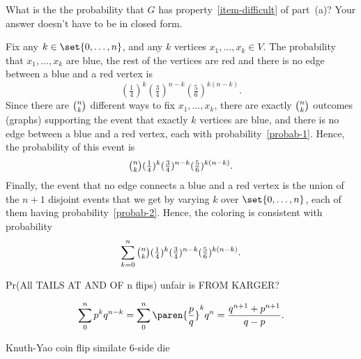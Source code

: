 \begin{problem}
\begin{enumerate}
\end{enumerate}


\ppart
What is the the probability that $G$ has
property~\eqref{item-difficult} of part~(a)? 
Your answer doesn't have  to be in closed form.

\begin{solution}
Fix any $k\in\set{0,\dots,n}$, and any $k$ vertices $x_1,\dots,x_k\in
V$. The probability that $x_1,\dots,x_k$ are blue, the rest of the
vertices are red and there is no edge between a blue and a red vertex
is 
\begin{equation} \label{probab-1}
(\tfrac{1}{4})^k 
(\tfrac{3}{4})^{n-k}
(\tfrac{5}{6})^{k(n-k)}.
\end{equation}
Since there are $\tbinom{n}{k}$ different ways to fix $x_1,\dots,x_k$,
there are exactly $\tbinom{n}{k}$ outcomes (graphs) supporting the
event that exactly $k$ vertices are blue, and there is no edge between
a blue and a red vertex, each with
probability~\eqref{probab-1}. Hence, the probability of this event is 
\begin{equation} \label{probab-2}
\tbinom{n}{k}
(\tfrac{1}{4})^k 
(\tfrac{3}{4})^{n-k}
(\tfrac{5}{6})^{k(n-k)}.
\end{equation}
Finally, the event that no edge connects a blue and a red vertex is
the union of the $n+1$ disjoint events that we get by varying $k$ over 
$\set{0,\dots,n}$, each of them having probability~\eqref{probab-2}. 
Hence, the coloring is consistent with probability 
\[
\sum_{k=0}^{n}
\tbinom{n}{k}
(\tfrac{1}{4})^k 
(\tfrac{3}{4})^{n-k}
(\tfrac{5}{6})^{k(n-k)}.
\]
\end{solution}


\eparts
\end{problem}

\begin{problem}
Pr(All TAILS AT AND OF n flips) unfair is 
FROM KARGER?

\[
\sum_0^n p^kq^{n-k} = \sum_0^n \paren{\frac{p}{q}}^k q^n = 
\frac{q^{n+1} + p^{n+1}}{q - p}. 
\]
\end{problem}

\begin{problem}
Knuth-Yao coin flip similate 6-side die
\end{problem}


